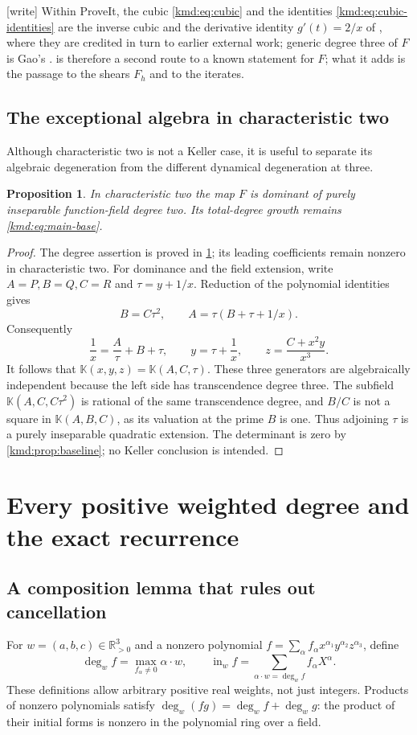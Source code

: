 \documentclass[11pt,a4paper]{article}
\numberwithin{equation}{section}
\newtheorem{proposition}[theorem]{Proposition}
\theoremstyle{definition}
\theoremstyle{remark}
\newcommand{\K}{\mathbb K}
\newcommand{\R}{\mathbb R}
\newcommand{\dd}{\operatorname{deg}}
\newcommand{\init}{\operatorname{in}}
\newcommand{\wtag}{\textup{[write]}}%
\begin{document}
\noindent\wtag{} Within ProveIt, the cubic \eqref{kmd:eq:cubic} and the
identities \eqref{kmd:eq:cubic-identities} are the inverse cubic and the
derivative identity $g'(t)=2/x$ of \cite{arithmetic}, where they are
credited in turn to earlier external work; generic degree three of $F$
is Gao's \cite{gao}.  is therefore a second route
to a known statement for $F$; what it adds is the passage to the shears
$F_h$ and to the iterates.

\subsection{The exceptional algebra in characteristic two}
Although characteristic two is not a Keller case, it is useful to
separate its algebraic degeneration from the different dynamical
degeneration at three.

\begin{proposition}\label{kmd:prop:char2}
In characteristic two the map $F$ is dominant of purely inseparable
function-field degree two. Its total-degree growth remains
\eqref{kmd:eq:main-base}.
\end{proposition}
\begin{proof}
The degree assertion is proved in \cref{kmd:sec:weighted}; its leading
coefficients remain nonzero in characteristic two. For dominance and
the field extension, write $A=P,B=Q,C=R$ and $\tau=y+1/x$. Reduction
of the polynomial identities gives
\[
 B=C\tau^2,\qquad A=\tau(B+\tau+1/x).
\]
Consequently
\[
 \frac1x=\frac A\tau+B+\tau,\qquad
 y=\tau+\frac1x,\qquad z=\frac{C+x^2y}{x^3}.
\]
It follows that $\K(x,y,z)=\K(A,C,\tau)$. These three generators
are algebraically independent because the left side has transcendence
degree three. The subfield $\K(A,C,C\tau^2)$ is rational of the same
transcendence degree, and $B/C$ is not a square in $\K(A,B,C)$, as
its valuation at the prime $B$ is one. Thus adjoining $\tau$ is a
purely inseparable quadratic extension. The determinant is zero by
\cref{kmd:prop:baseline}; no Keller conclusion is intended.
\end{proof}

\section{Every positive weighted degree and the exact recurrence}
\label{kmd:sec:weighted}

\subsection{A composition lemma that rules out cancellation}
For $w=(a,b,c)\in\R_{>0}^3$ and a nonzero polynomial
$f=\sum_\alpha f_\alpha x^{\alpha_1}y^{\alpha_2}z^{\alpha_3}$, define
\[
 \dd_w f=\max_{f_\alpha\ne0}\alpha\cdot w,
 \qquad
 \init_w f=\sum_{\alpha\cdot w=\dd_w f}f_\alpha X^\alpha.
\]
These definitions allow arbitrary positive real weights, not just
integers. Products of nonzero polynomials satisfy
$\dd_w(fg)=\dd_w f+\dd_w g$: the product of their initial forms is
nonzero in the polynomial ring over a field.
\end{document}
